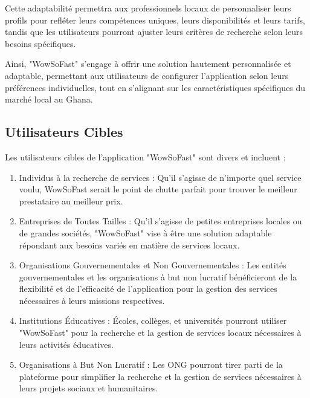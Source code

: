 {\vspace{0.5cm}

Cette adaptabilité permettra aux professionnels locaux de personnaliser leurs profils pour refléter leurs compétences uniques, leurs disponibilités et leurs tarifs, tandis que les utilisateurs pourront ajuster leurs critères de recherche selon leurs besoins spécifiques.

\vspace{0.5cm}

Ainsi, "WowSoFast" s'engage à offrir une solution hautement personnalisée et adaptable, permettant aux utilisateurs de configurer l'application selon leurs préférences individuelles, tout en s'alignant sur les caractéristiques spécifiques du marché local au Ghana.

\subsection{Utilisateurs Cibles}

Les utilisateurs cibles de l'application "WowSoFast" sont divers et incluent :

\begin{enumerate}

    \item Individus à la recherche de services : Qu'il s'agisse de n'importe quel service voulu, WowSoFast serait le point de chutte parfait pour trouver le meilleur prestataire au meilleur prix.

    \item Entreprises de Toutes Tailles : Qu'il s'agisse de petites entreprises locales ou de grandes sociétés, "WowSoFast" vise à être une solution adaptable répondant aux besoins variés en matière de services locaux.

    \item Organisations Gouvernementales et Non Gouvernementales : Les entités gouvernementales et les organisations à but non lucratif bénéficieront de la flexibilité et de l'efficacité de l'application pour la gestion des services nécessaires à leurs missions respectives.

    \item Institutions Éducatives : Écoles, collèges, et universités pourront utiliser "WowSoFast" pour la recherche et la gestion de services locaux nécessaires à leurs activités éducatives.

    \item Organisations à But Non Lucratif : Les ONG pourront tirer parti de la plateforme pour simplifier la recherche et la gestion de services nécessaires à leurs projets sociaux et humanitaires.


\end{enumerate}}
